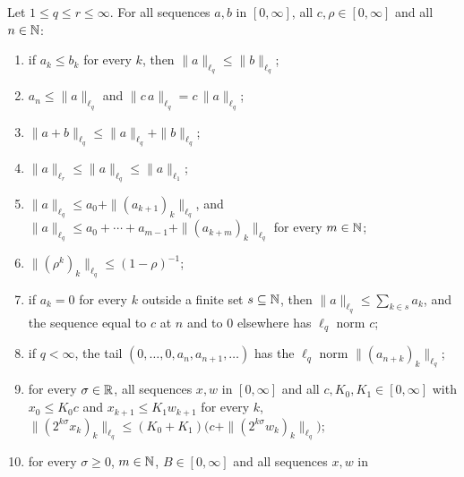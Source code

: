\begin{lemma}
\label{lem:lq-basic}
\leanok
{}
Let $1 \leq q \leq r \leq \infty$. For all sequences $a, b$ in $[0, \infty]$, all
$c, \rho \in [0, \infty]$ and all $n \in \mathbb{N}$:
\begin{enumerate}
  \item if $a_k \leq b_k$ for every $k$, then $\|a\|_{\ell_q} \leq \|b\|_{\ell_q}$;
  \item $a_n \leq \|a\|_{\ell_q}$ and $\|c\,a\|_{\ell_q} = c \, \|a\|_{\ell_q}$;
  \item $\|a + b\|_{\ell_q} \leq \|a\|_{\ell_q} + \|b\|_{\ell_q}$;
  \item $\|a\|_{\ell_r} \leq \|a\|_{\ell_q} \leq \|a\|_{\ell_1}$;
  \item $\|a\|_{\ell_q} \leq a_0 + \|(a_{k+1})_k\|_{\ell_q}$, and
    $\|a\|_{\ell_q} \leq a_0 + \cdots + a_{m-1} + \|(a_{k+m})_k\|_{\ell_q}$ for every $m \in \mathbb{N}$;
  \item $\|(\rho^k)_k\|_{\ell_q} \leq (1 - \rho)^{-1}$;
  \item if $a_k = 0$ for every $k$ outside a finite set $s \subseteq \mathbb{N}$, then
    $\|a\|_{\ell_q} \leq \sum_{k \in s} a_k$, and the sequence equal to $c$ at $n$ and to $0$
    elsewhere has $\ell_q$ norm $c$;
  \item if $q < \infty$, the tail $(0, \dots, 0, a_n, a_{n+1}, \dots)$ has the $\ell_q$ norm
    $\|(a_{n+k})_k\|_{\ell_q}$;
  \item for every $\sigma \in \mathbb{R}$, all sequences $x, w$ in $[0, \infty]$ and all
    $c, K_0, K_1 \in [0, \infty]$ with $x_0 \leq K_0 c$ and $x_{k+1} \leq K_1 w_{k+1}$ for every
    $k$, $\|(2^{k\sigma} x_k)_k\|_{\ell_q} \leq (K_0 + K_1)
    \bigl( c + \|(2^{k\sigma} w_k)_k\|_{\ell_q} \bigr)$;
  \item for every $\sigma \geq 0$, $m \in \mathbb{N}$, $B \in [0, \infty]$ and all sequences $x, w$ in

\end{enumerate}
\end{lemma}
